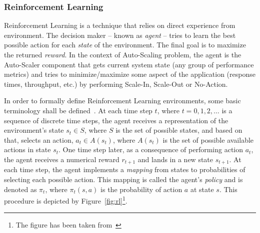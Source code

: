 \subsubsection{Reinforcement Learning}

Reinforcement Learning is a technique that relies on direct experience from environment. The decision maker -- known as \emph{agent} -- tries to learn the best possible action for each \emph{state} of the environment. The final goal is to maximize the returned \emph{reward}. In the context of Auto-Scaling problem, the agent is the Auto-Scaler component that gets current system state (any group of performance metrics) and tries to minimize/maximize some aspect of the application (response times, throughput, etc.) by performing Scale-In, Scale-Out or No-Action.

In order to formally define Reinforcement Learning environments, some basic terminology shall be defined~\cite{rlIntro}. At each time step $t$, where $t = 0,1,2,\dots$ is a sequence of discrete time steps, the agent receives a representation of the environment's state $s_t \in S$, where $S$ is the set of possible states, and based on that, selects an action, $a_t \in A(s_t)$, where $A(s_t)$ is the
set of possible available actions in state $s_t$. One time step later, as a consequence of performing action $a_t$, the agent receives a numerical reward $r_{t+1}$ and lands in a new state $s_{t+1}$. At each time step, the agent implements a \emph{mapping} from states to probabilities of selecting each possible action. This mapping is called the agent's \emph{policy} and is denoted as $\pi_t$, where $\pi_t(s,a)$ is the probability of action $a$ at state $s$. This procedure is depicted by Figure~\ref{fig:rl}\footnote{The figure has been taken from~\textcite{rlIntro}}.

